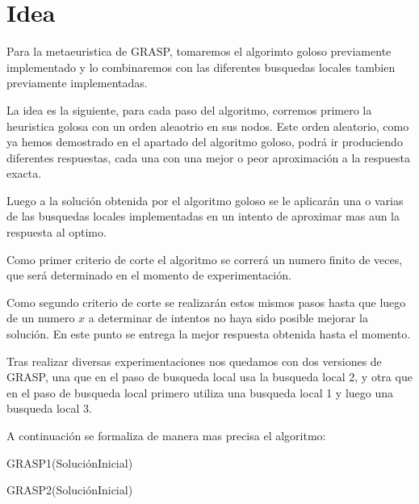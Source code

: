 \section{Idea}

Para la metaeuristica de GRASP, tomaremos el algorimto goloso previamente implementado y lo combinaremos con las diferentes busquedas locales tambien previamente implementadas.

La idea es la siguiente, para cada paso del algoritmo, corremos primero la heuristica golosa con un orden aleaotrio en sus nodos. Este orden aleatorio, como ya hemos demostrado en el apartado del algoritmo goloso, podrá ir produciendo diferentes respuestas, cada una con una mejor o peor aproximación a la respuesta exacta.

Luego a la solución obtenida por el algoritmo goloso se le aplicarán una o varias de las busquedas locales implementadas en un intento de aproximar mas aun la respuesta al optimo.

Como primer criterio de corte el algoritmo se correrá un numero finito de veces, que será determinado en el momento de experimentación.

Como segundo criterio de corte se realizarán estos mismos pasos hasta que luego de un numero $x$ a determinar de intentos no haya sido posible mejorar la solución. En este punto se entrega la mejor respuesta obtenida hasta el momento.

Tras realizar diversas experimentaciones nos quedamos con dos versiones de GRASP, una que en el paso de busqueda local usa la busqueda local 2, y otra que en el paso de busqueda local primero utiliza una busqueda local 1 y luego una busqueda local 3.

A continuación se formaliza de manera mas precisa el algoritmo:

\begin{algorithm}
  	\begin{algorithmic}[1]\parskip=1mm
		 \caption{ GRASP1(SoluciónInicial) }
	\end{algorithmic}
\end{algorithm}

\begin{algorithm}
  	\begin{algorithmic}[1]\parskip=1mm
		 \caption{ GRASP2(SoluciónInicial) }
	\end{algorithmic}
\end{algorithm}

